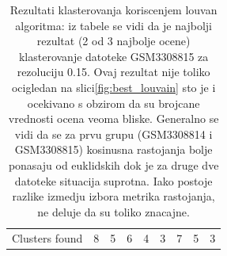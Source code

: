 \documentclass{article}
\begin{document}
\begin{table}[!h]
{\begin{tabular}{lllllllll}
\multicolumn{1}{|l|}{Clusters found} & 8 & 5 & \multicolumn{1}{l|}{6} & \multicolumn{1}{l|}{\cellcolor[HTML]{67FD9A}4} & 3 & 7 & 5 & 3 \\ \cline{1-1} \cline{5-5}
\end{tabular}%
}
\caption{Rezultati klasterovanja koriscenjem louvan algoritma: iz tabele se vidi da je najbolji rezultat (2 od 3 najbolje ocene) klasterovanje datoteke GSM3308815 za rezoluciju 0.15. Ovaj rezultat nije toliko ocigledan na slici\ref{fig:best_louvain} sto je i ocekivano s obzirom da su brojcane vrednosti ocena veoma bliske. Generalno se vidi da se za prvu grupu (GSM3308814 i GSM3308815) kosinusna rastojanja bolje ponasaju od euklidskih dok je za druge dve datoteke situacija suprotna. Iako postoje razlike izmedju izbora metrika rastojanja, ne deluje da su toliko znacajne.  } \label{tab:louvain-results}
\end{table}
\end{document}
